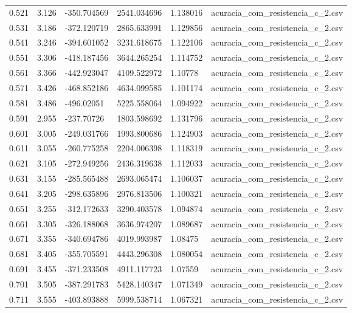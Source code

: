 \begin{table}
\begin{tabular}{llllll}
0.521 & 3.126 & -350.704569 & 2541.034696 & 1.138016 & acuracia\_com\_resistencia\_c\_2.csv \\
0.531 & 3.186 & -372.120719 & 2865.633991 & 1.129856 & acuracia\_com\_resistencia\_c\_2.csv \\
0.541 & 3.246 & -394.601052 & 3231.618675 & 1.122106 & acuracia\_com\_resistencia\_c\_2.csv \\
0.551 & 3.306 & -418.187456 & 3644.265254 & 1.114752 & acuracia\_com\_resistencia\_c\_2.csv \\
0.561 & 3.366 & -442.923047 & 4109.522972 & 1.10778 & acuracia\_com\_resistencia\_c\_2.csv \\
0.571 & 3.426 & -468.852186 & 4634.099585 & 1.101174 & acuracia\_com\_resistencia\_c\_2.csv \\
0.581 & 3.486 & -496.02051 & 5225.558064 & 1.094922 & acuracia\_com\_resistencia\_c\_2.csv \\
0.591 & 2.955 & -237.70726 & 1803.598692 & 1.131796 & acuracia\_com\_resistencia\_c\_2.csv \\
0.601 & 3.005 & -249.031766 & 1993.800686 & 1.124903 & acuracia\_com\_resistencia\_c\_2.csv \\
0.611 & 3.055 & -260.775258 & 2204.006398 & 1.118319 & acuracia\_com\_resistencia\_c\_2.csv \\
0.621 & 3.105 & -272.949256 & 2436.319638 & 1.112033 & acuracia\_com\_resistencia\_c\_2.csv \\
0.631 & 3.155 & -285.565488 & 2693.065474 & 1.106037 & acuracia\_com\_resistencia\_c\_2.csv \\
0.641 & 3.205 & -298.635896 & 2976.813506 & 1.100321 & acuracia\_com\_resistencia\_c\_2.csv \\
0.651 & 3.255 & -312.172633 & 3290.403578 & 1.094874 & acuracia\_com\_resistencia\_c\_2.csv \\
0.661 & 3.305 & -326.188068 & 3636.974207 & 1.089687 & acuracia\_com\_resistencia\_c\_2.csv \\
0.671 & 3.355 & -340.694786 & 4019.993987 & 1.08475 & acuracia\_com\_resistencia\_c\_2.csv \\
0.681 & 3.405 & -355.705591 & 4443.296308 & 1.080054 & acuracia\_com\_resistencia\_c\_2.csv \\
0.691 & 3.455 & -371.233508 & 4911.117723 & 1.07559 & acuracia\_com\_resistencia\_c\_2.csv \\
0.701 & 3.505 & -387.291783 & 5428.140347 & 1.071349 & acuracia\_com\_resistencia\_c\_2.csv \\
0.711 & 3.555 & -403.893888 & 5999.538714 & 1.067321 & acuracia\_com\_resistencia\_c\_2.csv \\

\end{tabular}
\end{table}
